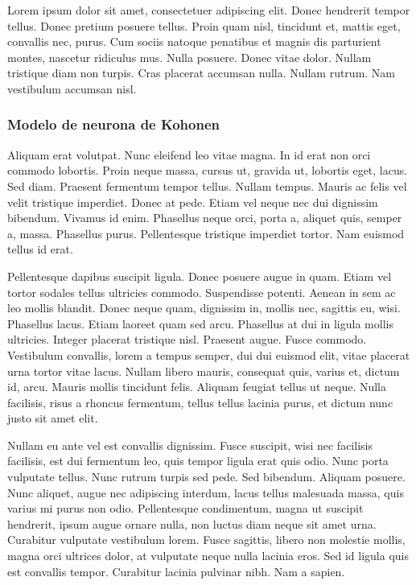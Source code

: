 Lorem ipsum dolor sit amet, consectetuer adipiscing elit.  Donec
hendrerit tempor tellus.  Donec pretium posuere tellus.  Proin quam
nisl, tincidunt et, mattis eget, convallis nec, purus.  Cum sociis
natoque penatibus et magnis dis parturient montes, nascetur ridiculus
mus.  Nulla posuere.  Donec vitae dolor.  Nullam tristique diam non
turpis.  Cras placerat accumsan nulla.  Nullam rutrum.  Nam vestibulum
accumsan nisl.

\subsubsection{Modelo de neurona de Kohonen}

Aliquam erat volutpat.  Nunc eleifend leo vitae magna.  In id erat non
orci commodo lobortis.  Proin neque massa, cursus ut, gravida ut,
lobortis eget, lacus.  Sed diam.  Praesent fermentum tempor tellus.
Nullam tempus.  Mauris ac felis vel velit tristique imperdiet.  Donec
at pede.  Etiam vel neque nec dui dignissim bibendum.  Vivamus id
enim.  Phasellus neque orci, porta a, aliquet quis, semper a, massa.
Phasellus purus.  Pellentesque tristique imperdiet tortor.  Nam
euismod tellus id erat.

Pellentesque dapibus suscipit ligula.  Donec posuere augue in quam.
Etiam vel tortor sodales tellus ultricies commodo.  Suspendisse
potenti.  Aenean in sem ac leo mollis blandit.  Donec neque quam,
dignissim in, mollis nec, sagittis eu, wisi.  Phasellus lacus.  Etiam
laoreet quam sed arcu.  Phasellus at dui in ligula mollis ultricies.
Integer placerat tristique nisl.  Praesent augue.  Fusce commodo.
Vestibulum convallis, lorem a tempus semper, dui dui euismod elit,
vitae placerat urna tortor vitae lacus.  Nullam libero mauris,
consequat quis, varius et, dictum id, arcu.  Mauris mollis tincidunt
felis.  Aliquam feugiat tellus ut neque.  Nulla facilisis, risus a
rhoncus fermentum, tellus tellus lacinia purus, et dictum nunc justo
sit amet elit.

Nullam eu ante vel est convallis dignissim.  Fusce suscipit, wisi nec
facilisis facilisis, est dui fermentum leo, quis tempor ligula erat
quis odio.  Nunc porta vulputate tellus.  Nunc rutrum turpis sed pede.
Sed bibendum.  Aliquam posuere.  Nunc aliquet, augue nec adipiscing
interdum, lacus tellus malesuada massa, quis varius mi purus non odio.
Pellentesque condimentum, magna ut suscipit hendrerit, ipsum augue
ornare nulla, non luctus diam neque sit amet urna.  Curabitur
vulputate vestibulum lorem.  Fusce sagittis, libero non molestie
mollis, magna orci ultrices dolor, at vulputate neque nulla lacinia
eros.  Sed id ligula quis est convallis tempor.  Curabitur lacinia
pulvinar nibh.  Nam a sapien.

